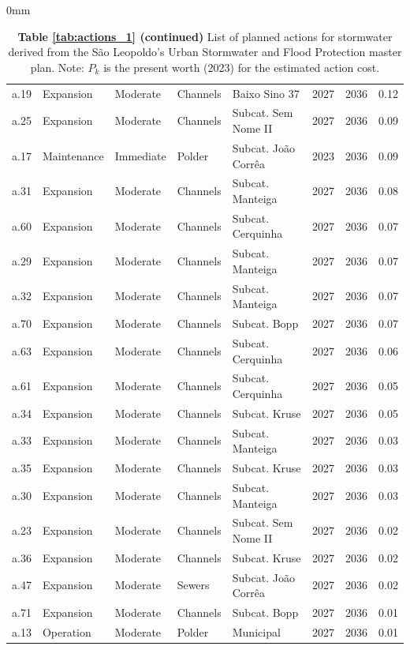 \documentclass[./main.tex]{subfiles}
\begin{document}
\begin{adjustwidth}{\bodytab}{0mm}
\begin{table}[h]
\begin{tabular}{lllllrrr}
a.19 &     Expansion &  Moderate & Channels &       Baixo Sino 37 &   2027 & 2036 &  0.12 \\
a.25 &     Expansion &  Moderate & Channels & Subcat. Sem Nome II &   2027 & 2036 &  0.09 \\
a.17 &   Maintenance & Immediate &   Polder & Subcat. João Corrêa &   2023 & 2036 &  0.09 \\
a.31 &     Expansion &  Moderate & Channels &    Subcat. Manteiga &   2027 & 2036 &  0.08 \\
a.60 &     Expansion &  Moderate & Channels &   Subcat. Cerquinha &   2027 & 2036 &  0.07 \\
a.29 &     Expansion &  Moderate & Channels &    Subcat. Manteiga &   2027 & 2036 &  0.07 \\
a.32 &     Expansion &  Moderate & Channels &    Subcat. Manteiga &   2027 & 2036 &  0.07 \\
a.70 &     Expansion &  Moderate & Channels &        Subcat. Bopp &   2027 & 2036 &  0.07 \\
a.63 &     Expansion &  Moderate & Channels &   Subcat. Cerquinha &   2027 & 2036 &  0.06 \\
a.61 &     Expansion &  Moderate & Channels &   Subcat. Cerquinha &   2027 & 2036 &  0.05 \\
a.34 &     Expansion &  Moderate & Channels &       Subcat. Kruse &   2027 & 2036 &  0.05 \\
a.33 &     Expansion &  Moderate & Channels &    Subcat. Manteiga &   2027 & 2036 &  0.03 \\
a.35 &     Expansion &  Moderate & Channels &       Subcat. Kruse &   2027 & 2036 &  0.03 \\
a.30 &     Expansion &  Moderate & Channels &    Subcat. Manteiga &   2027 & 2036 &  0.03 \\
a.23 &     Expansion &  Moderate & Channels & Subcat. Sem Nome II &   2027 & 2036 &  0.02 \\
a.36 &     Expansion &  Moderate & Channels &       Subcat. Kruse &   2027 & 2036 &  0.02 \\
a.47 &     Expansion &  Moderate &   Sewers & Subcat. João Corrêa &   2027 & 2036 &  0.02 \\
a.71 &     Expansion &  Moderate & Channels &        Subcat. Bopp &   2027 & 2036 &  0.01 \\
a.13 &     Operation &  Moderate &   Polder &           Municipal &   2027 & 2036 &  0.01 \\
\bottomrule
\end{tabular}
\caption*{\textbf{Table \ref{tab:actions_1} (continued)} List of planned actions for stormwater derived from the São Leopoldo's Urban Stormwater and Flood Protection master plan. Note: $P_k$ is the present worth (2023) for the estimated action cost.}
\end{table}

\blindtext[2]

\blindtext[2]

\end{adjustwidth}
\end{document}
